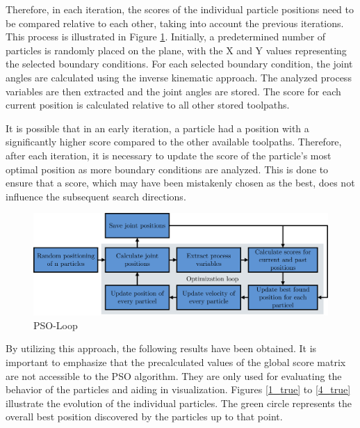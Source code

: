 Therefore, in each iteration, the scores of the individual particle positions need to be compared relative to each other, taking into account the previous iterations. This process is illustrated in Figure \ref{swarmloop}. Initially, a predetermined number of particles is randomly placed on the plane, with the X and Y values representing the selected boundary conditions. For each selected boundary condition, the joint angles are calculated using the inverse kinematic approach. The analyzed process variables are then extracted and the joint angles are stored. The score for each current position is calculated relative to all other stored toolpaths.

It is possible that in an early iteration, a particle had a position with a significantly higher score compared to the other available toolpaths. Therefore, after each iteration, it is necessary to update the score of the particle's most optimal position as more boundary conditions are analyzed. This is done to ensure that a score, which may have been mistakenly chosen as the best, does not influence the subsequent search directions.

\begin{figure}[H]
	\centerline{\includegraphics[width=1\textwidth]{figures/swarmloop.png}}
	\caption{PSO-Loop}
	\label{swarmloop}
\end{figure}

By utilizing this approach, the following results have been obtained. It is important to emphasize that the precalculated values of the global score matrix are not accessible to the \acrshort{PSO} algorithm. They are only used for evaluating the behavior of the particles and aiding in visualization. Figures \ref{1_true} to \ref{4_true} illustrate the evolution of the individual particles. The green circle represents the overall best position discovered by the particles up to that point.\newpage


